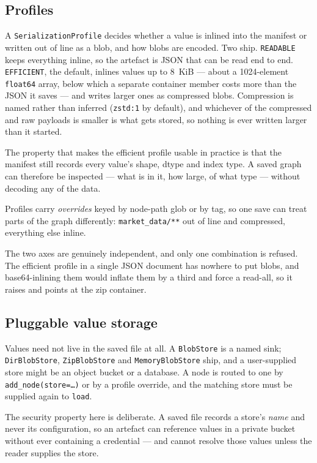 \documentclass[11pt,a4paper]{article}
\newcommand{\code}[1]{\texttt{#1}}
\begin{document}
\subsection{Profiles}

A \code{SerializationProfile} decides whether a value is inlined into the
manifest or written out of line as a blob, and how blobs are encoded. Two ship.
\code{READABLE} keeps everything inline, so the artefact is JSON that can be
read end to end. \code{EFFICIENT}, the default, inlines values up to 8~KiB ---
about a 1024-element \code{float64} array, below which a separate container
member costs more than the JSON it saves --- and writes larger ones as
compressed blobs. Compression is named rather than inferred (\code{zstd:1} by
default), and whichever of the compressed and raw payloads is smaller is what
gets stored, so nothing is ever written larger than it started.

The property that makes the efficient profile usable in practice is that the
manifest still records every value's shape, dtype and index type. A saved graph
can therefore be inspected --- what is in it, how large, of what type --- without
decoding any of the data.

Profiles carry \emph{overrides} keyed by node-path glob or by tag, so one save
can treat parts of the graph differently: \code{market\_data/**} out of line and
compressed, everything else inline.

The two axes are genuinely independent, and only one combination is refused.
The efficient profile in a single JSON document has nowhere to put blobs, and
base64-inlining them would inflate them by a third and force a read-all, so it
raises and points at the zip container.

\subsection{Pluggable value storage}

Values need not live in the saved file at all. A \code{BlobStore} is a named
sink; \code{DirBlobStore}, \code{ZipBlobStore} and \code{MemoryBlobStore} ship,
and a user-supplied store might be an object bucket or a database. A node is
routed to one by \code{add\_node(store=\ldots)} or by a profile override, and the
matching store must be supplied again to \code{load}.

The security property here is deliberate. A saved file records a store's
\emph{name} and never its configuration, so an artefact can reference values in
a private bucket without ever containing a credential --- and cannot resolve
those values unless the reader supplies the store.
\end{document}

